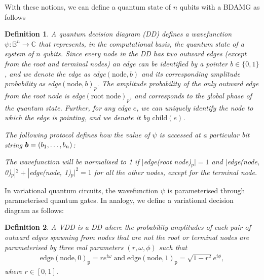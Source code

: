 \documentclass{ieeeaccess}
\makeatletter
\newtheorem{definition}{Definition}
\newcommand{\removelatexerror}{\let\@latex@error\@gobble}
\makeatother
\begin{document}
With these notions, we can define a quantum state of $n$ qubits with a BDAMG as follows
\begin{definition}
    \label{def:qdd}
    A quantum decision diagram (DD) defines a wavefunction $\psi:\mathbb{B}^n\to\mathbb{C}$ that represents, in the computational basis, the quantum state of a system of $n$ qubits.
    Since every node in the DD has two outward edges (except from the root and terminal nodes) an edge can be identified by a pointer $b\in\{0,1\}$, and we denote the edge as edge$(\text{node}, b)$ and its corresponding amplitude probability as edge$(\textrm{node}, b)_p$.
    The amplitude probability of the only outward edge from the root node is edge$(\textrm{root node})_p$, and corresponds to the global phase of the quantum state.
    Further, for any edge $e$, we can uniquely identify the node to which the edge is pointing, and we denote it by $\text{child}(e)$.
    
    The following protocol defines how the value of $\psi$ is accessed at a particular bit string $\vb*{b}=(b_1,\ldots,b_n)$:
    
    \begin{myalgorithm}
    \removelatexerror
        \SetAlgoLined
    \end{myalgorithm}
    
    The wavefunction will be normalised to 1 if $|$edge(root node)$_p|=1$ and $|$edge(node, 0)$_p|^2 + |$edge(node, 1)$_p|^2=1$ for all the other nodes, except for the terminal node.
\end{definition}

In variational quantum circuits, the wavefunction $\psi$ is parameterised through parameterised quantum gates.
In analogy, we define a variational decision diagram as follows:

\begin{definition}\label{def:vdd}
    A VDD is a DD where the probability amplitudes of each pair of outward edges spawning from nodes that are not the root or terminal nodes are parameterised by three real parameters $(r, \omega, \phi)$ such that
    \begin{align}
        \text{edge}(\text{node}, 0)_\text{p} = re^{i\omega}\;\text{and}\;\text{edge}(\text{node}, 1)_\text{p} = \sqrt{1-r^2}e^{i\phi},\label{eq:nodes_weights}
    \end{align}
    where $r\in[0, 1]$.
\end{definition}
\end{document}
